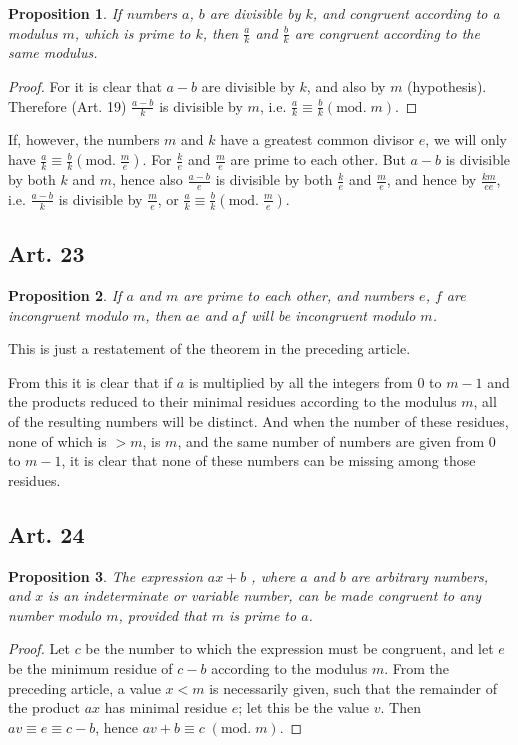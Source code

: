 \documentclass{book}
\theoremstyle{plain}
\newtheorem{proposition}{Proposition}
\theoremstyle{remark}
\begin{document}
\begin{proposition} If numbers $a$, $b$ are divisible by $k$, and congruent according to a modulus $m$, which is prime to $k$, then $\frac{a}{k}$ and $\frac{b}{k}$ are congruent according to the same modulus.\end{proposition}
\begin{proof} For it is clear that $a-b$ are divisible by $k$, and also by $m$ (hypothesis).  Therefore (Art. 19) $\frac{a-b}{k}$ is divisible by $m$, i.e. $\frac{a}{k} \equiv \frac{b}{k} (\mathrm{mod.}\; m)$.
\end{proof}

If, however, the numbers $m$ and $k$ have a greatest common divisor $e$, we will only have $\frac{a}{k} \equiv \frac{b}{k} (\mathrm{mod.} \; \frac{m}{e})$. For $\frac{k}{e}$ and $\frac{m}{e}$ are prime to each other.  But $a-b$ is divisible by both $k$ and $m$, hence also $\frac{a-b}{e}$ is divisible by both $\frac{k}{e}$ and $\frac{m}{e}$, and hence by $\frac{km}{ee}$, i.e. $\frac{a-b}{k}$ is divisible by $\frac{m}{e}$, or $\frac{a}{k} \equiv \frac{b}{k} (\mathrm{mod.}\;\frac{m}{e})$.

\subsection*{Art. 23}

\begin{proposition} If $a$ and $m$ are prime to each other, and numbers $e$, $f$ are incongruent modulo $m$, then $ae$ and $af$ will be incongruent modulo $m$. \end{proposition}

This is just a restatement of the theorem in the preceding article.

From this it is clear that if $a$ is multiplied by all the integers from $0$ to $m-1$ and the products reduced to their minimal residues according to the modulus $m$, all of the resulting numbers will be distinct.  And when the number of these residues, none of which is $>m$, is $m$, and the same number of numbers are given from $0$ to $m-1$, it is clear that none of these numbers can be missing among those residues.

\subsection*{Art. 24} 

\begin{proposition} The expression $ax+b$ , where $a$ and $b$ are arbitrary numbers, and $x$ is an indeterminate or variable number, can be made congruent to any number modulo $m$, provided that $m$ is prime to $a$. \end{proposition}
\begin{proof} 
Let $c$ be the number to which the expression must be congruent, and let $e$ be the minimum residue of $c-b$ according to the modulus $m$.  From the preceding article, a value $x<m$ is necessarily given, such that the remainder of the product $ax$ has minimal residue $e$; let this be the value $v$.   Then $av \equiv e \equiv c-b$, hence $av+b \equiv c\; (\mathrm{mod.} \; m)$. 
\end{proof}
\end{document}
